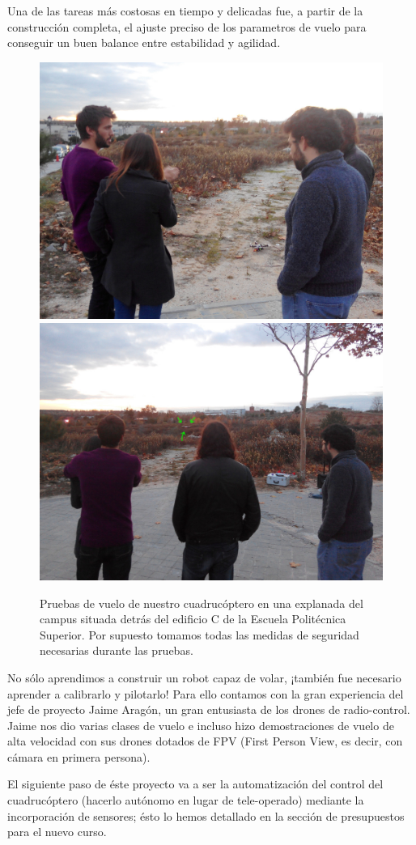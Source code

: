\documentclass[12pt,twoside]{report}
\begin{document}
Una de las tareas más costosas en tiempo y delicadas fue, a partir de la construcción completa, el ajuste preciso de los parametros de vuelo para conseguir un buen balance entre estabilidad y agilidad.

\begin{figure}[hbtp]
\centerline{\includegraphics[width=0.6\linewidth]{fotos/2015-12-11_PruebaVuelo_JaimeCrisPabloRafa.jpg} \includegraphics[width=0.6\linewidth]{fotos/2015-12-11_PruebaVuelo_CrisJaimeRafaPablo.jpg}}
\caption*{
Pruebas de vuelo de nuestro cuadrucóptero en una explanada del campus situada detrás del edificio C de la Escuela Politécnica Superior. Por supuesto tomamos todas las medidas de seguridad necesarias durante las pruebas.
}
\end{figure}

No sólo aprendimos a construir un robot capaz de volar, ¡también fue necesario aprender a calibrarlo y pilotarlo!
Para ello contamos con la gran experiencia del jefe de proyecto Jaime Aragón, un gran entusiasta de los drones de radio-control. Jaime nos dio varias clases de vuelo e incluso hizo demostraciones de vuelo de alta velocidad con sus drones dotados de FPV (First Person View, es decir, con cámara en primera persona).

El siguiente paso de éste proyecto va a ser la automatización del control del cuadrucóptero (hacerlo autónomo en lugar de tele-operado) mediante la incorporación de sensores; ésto lo hemos detallado en la sección de presupuestos para el nuevo curso.
\end{document}

